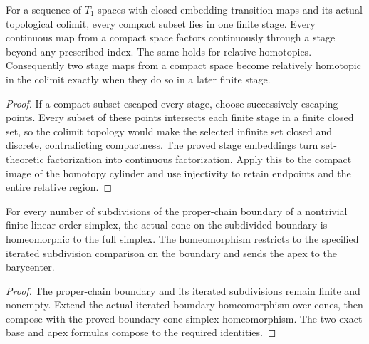 \begin{proposition}
  \label{prop:actual-sequential-compact-factorization}
  \leanok
  For a sequence of $T_1$ spaces with closed embedding transition maps and its actual topological colimit, every compact subset lies in one finite stage. Every continuous map from a compact space factors continuously through a stage beyond any prescribed index. The same holds for relative homotopies. Consequently two stage maps from a compact space become relatively homotopic in the colimit exactly when they do so in a later finite stage.
\end{proposition}
\begin{proof}
  If a compact subset escaped every stage, choose successively escaping points. Every subset of these points intersects each finite stage in a finite closed set, so the colimit topology would make the selected infinite set closed and discrete, contradicting compactness. The proved stage embeddings turn set-theoretic factorization into continuous factorization. Apply this to the compact image of the homotopy cylinder and use injectivity to retain endpoints and the entire relative region.
  \leanok
\end{proof}

\begin{proposition}
  \label{prop:actual-iterated-boundary-cone}
  \leanok
  For every number of subdivisions of the proper-chain boundary of a nontrivial finite linear-order simplex, the actual cone on the subdivided boundary is homeomorphic to the full simplex. The homeomorphism restricts to the specified iterated subdivision comparison on the boundary and sends the apex to the barycenter.
\end{proposition}
\begin{proof}
  The proper-chain boundary and its iterated subdivisions remain finite and nonempty. Extend the actual iterated boundary homeomorphism over cones, then compose with the proved boundary-cone simplex homeomorphism. The two exact base and apex formulas compose to the required identities.
  \leanok
\end{proof}

